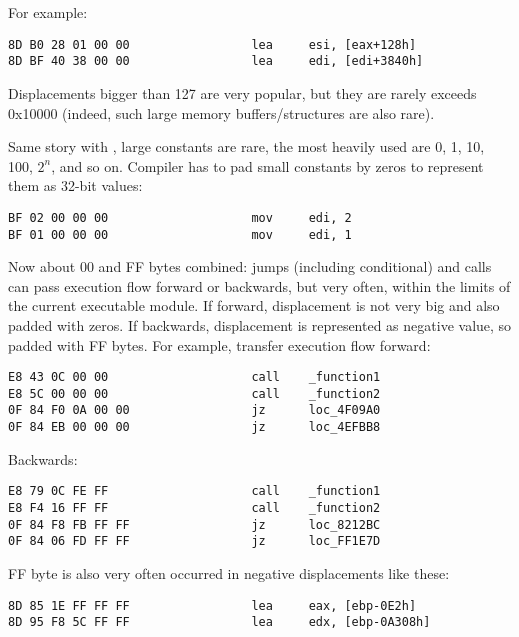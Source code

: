 For example:

\begin{lstlisting}[style=customasmx86]
8D B0 28 01 00 00                 lea     esi, [eax+128h]
8D BF 40 38 00 00                 lea     edi, [edi+3840h]
\end{lstlisting}

Displacements bigger than 127 are very popular, but they are rarely exceeds 0x10000
(indeed, such large memory buffers/structures are also rare).

Same story with , large constants are rare, the most heavily used are 0, 1, 10, 100, $2^n$, and so on.
Compiler has to pad small constants by zeros to represent them as 32-bit values:

\begin{lstlisting}[style=customasmx86]
BF 02 00 00 00                    mov     edi, 2
BF 01 00 00 00                    mov     edi, 1
\end{lstlisting}

Now about 00 and FF bytes combined: jumps (including conditional) and calls can pass execution flow forward or backwards, but very often,
within the limits of the current executable module.
If forward, displacement is not very big and also padded with zeros.
If backwards, displacement is represented as negative value, so padded with FF bytes.
For example, transfer execution flow forward:

\begin{lstlisting}[style=customasmx86]
E8 43 0C 00 00                    call    _function1
E8 5C 00 00 00                    call    _function2
0F 84 F0 0A 00 00                 jz      loc_4F09A0
0F 84 EB 00 00 00                 jz      loc_4EFBB8
\end{lstlisting}

Backwards:

\begin{lstlisting}[style=customasmx86]
E8 79 0C FE FF                    call    _function1
E8 F4 16 FF FF                    call    _function2
0F 84 F8 FB FF FF                 jz      loc_8212BC
0F 84 06 FD FF FF                 jz      loc_FF1E7D
\end{lstlisting}

FF byte is also very often occurred in negative displacements like these:

\begin{lstlisting}[style=customasmx86]
8D 85 1E FF FF FF                 lea     eax, [ebp-0E2h]
8D 95 F8 5C FF FF                 lea     edx, [ebp-0A308h]
\end{lstlisting}


